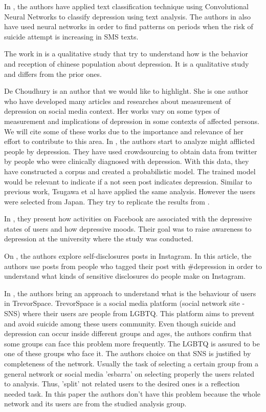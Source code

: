 \documentclass[sigconf]{acmart}
\begin{document}
In \cite{Zhao:2018:TCM:3302425.3302501}, the authors have applied text classification technique using Convolutional Neural Networks to classify depression using text analysis. The authors in \cite{Nobles:2018:IIS:3173574.3173987} also have used neural networks in order to find patterns on periods when the risk of suicide attempt is increasing in SMS texts.

The work in \cite{Li2016} is a qualitative study that try to understand how is the behavior and reception of chinese population about depression. It is a qualitative study and differs from the prior ones.

De Choudhury is an author that we would like to highlight. She is one author who have developed many articles and researches about measurement of depression on social media context. Her works vary on some types of measurement and implications of depression in some contexts of affected persons. We will cite some of these works due to the importance and relevance of her effort to contribute to this area. In \cite{DeChoudhury:2013:SMM:2464464.2464480}, the authors start to analyze might afflicted people by depression. They have used crowdsourcing to obtain data from twitter by people who were clinically diagnosed with depression. With this data, they have constructed a corpus and created a probabilistic model. The trained model would be relevant to indicate if a not seen post indicates depression.
Similar to previous work, Tsugawa et al \cite{Tsugawa2015} have applied the same analysis. However the users were selected from Japan. They try to replicate the results from \cite{DeChoudhury:2013:SMM:2464464.2464480}.

In \cite{Park:2015:MDL:2675133.2675139}, they present how activities on Facebook are associated with the depressive states of users and how depressive moods.  Their goal was to raise awareness to depression at the university where the study was conducted.

On \cite{andalibi_sensitive_2017}, the authors explore self-disclosures posts in Instagram. In this article, the authors use posts from people who tagged their post with \#depression in order to understand what kinds of sensitive disclosures do people make on Instagram.

In \cite{Homan:2014:SSD:2531602.2531704}, %
the authors bring an approach to understand what is the behaviour of users in TrevorSpace. TrevorSpace is a social media platform (social network site - SNS) where their users are people from LGBTQ. This platform aims to prevent and avoid suicide among these users community.
Even though suicide and depression can occur inside different groups and ages, the authors confirm that some groups can face this problem more frequently. The LGBTQ is assured to be one of these groups who face it.
The authors choice on that SNS is justified by completeness of the network. Usually the task of selecting a certain group from a general network or social media 'esbarra' on selecting properly the users related to analysis. Thus, 'split' not related users to the desired ones is a reflection needed task. In this paper the authors don't have this problem because the whole network and its users are from the studied analysis group.
\end{document}

